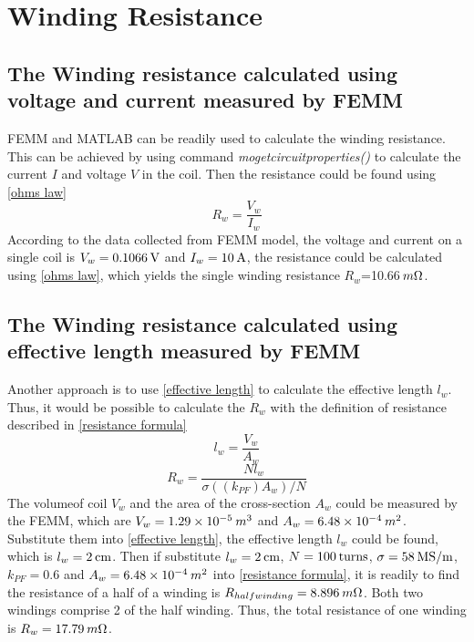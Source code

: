 \documentclass[a4paper]{IEEEtran}
\begin{document}
\section{Winding Resistance}
\subsection{The Winding resistance calculated using voltage and current measured by FEMM}                  
FEMM and MATLAB can be readily used to calculate the winding resistance. 
This can be achieved by using command \textit{mo\textunderscore getcircuitproperties()} to calculate the current $I$ and voltage $V$ in the coil.
Then the resistance could be found using \eqref{ohms law}
\begin{equation}
R_w=\frac{V_w}{I_w} \label{ohms law}
\end{equation}
According to the data collected from FEMM model, the voltage and current on a single coil is $V_w=0.1066\hskip 0.2em\text{V}$
and $I_w=10\hskip 0.2em\text{A}$, the resistance could be calculated using \eqref{ohms law}, which yields the single winding resistance $R_{w}$=10.66$\hskip 0.2emm\Omega$.
\subsection{The Winding resistance calculated using effective length measured by FEMM}
Another approach is to use \eqref{effective length} to calculate the effective length $l_w$.
Thus, it would be possible to calculate the $R_w$ with the definition of resistance described in \eqref{resistance formula}\cite{notes_a}
\begin{equation}%
l_w=\frac{V_w}{A_w} \label{effective length}
\end{equation}
\begin{equation}
R_w=\frac{Nl_w}{\sigma((k_{PF})A_w)/N} \label{resistance formula}
\end{equation}
The volumeof coil $V_w$ and the area of the cross-section $A_w$ could be measured by
the FEMM, which are $V_w= 1.29\times10^{-5}\hskip 0.2em m^3$ and $A_w=6.48\times10^{-4}\hskip 0.2em m^2$.
Substitute them into \eqref{effective length}, the effective length $l_w$ could be found, which is 
$l_w=2\hskip 0.2em\text{cm}$. Then if substitute $l_w=2\hskip 0.2em\text{cm}$, $N=100\hskip 0.2em\text{turns}$, 
$\sigma=58 \hskip 0.2em\text{MS/m}$, $k_{PF}=0.6$ and $A_w=6.48\times10^{-4}\hskip 0.2em m^2$ into \eqref{resistance formula}, 
it is readily to find the resistance of a half of a winding is $R_{halfwinding}=8.896\hskip 0.2emm\Omega$. Both two windings
comprise 2 of the half winding. Thus, the total resistance of one winding is $R_{w}=17.79\hskip 0.2emm\Omega$.
\end{document}
